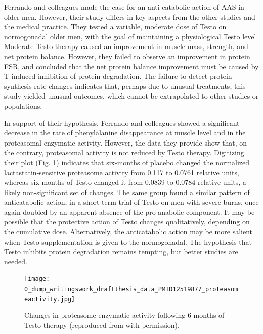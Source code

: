 \documentclass[12pt,english]{report}\usepackage[]{graphicx}\usepackage[]{color}
\begin{document}
Ferrando and colleagues made the case for an anti-catabolic action
of AAS in older men\citep{ferrando2003differential}. However, their
study differs in key aspects from the other studies and the medical
practice. They tested a variable, moderate dose of Testo on normogonadal
older men, with the goal of maintaining a physiological Testo level.
Moderate Testo therapy caused an improvement in muscle mass, strength,
and net protein balance. However, they failed to observe an improvement
in protein FSR, and concluded that the net protein balance improvement
must be caused by T-induced inhibition of protein degradation. The
failure to detect protein synthesis rate changes indicates that, perhaps
due to unusual treatments, this study yielded unusual outcomes, which
cannot be extrapolated to other studies or populations.

In support of their hypothesis, Ferrando and colleagues showed a significant
decrease in the rate of phenylalanine disappearance at muscle level
and in the proteasomal enzymatic activity. However, the data they
provide show that, on the contrary, proteasomal activity is not reduced
by Testo therapy. Digitizing their plot (Fig. \ref{fig:Changes-in-proteasome})
indicates that six-months of placebo changed the normalized lactastatin-sensitive
proteasome activity from 0.117
to 0.0761
relative units, whereas six months of Testo changed it from 0.0839
to 0.0784
relative units, a likely non-significant set of changes. The same
group found a similar pattern of anticatabolic action, in a short-term
trial of Testo on men with severe burns, once again doubled by an
apparent absence of the pro-anabolic component\citep{ferrando2001testosterone}.
It may be possible that the protective action of Testo changes qualitatively,
depending on the cumulative dose. Alternatively, the anticatabolic
action may be more salient when Testo supplementation is given to
the normogonadal. The hypothesis that Testo inhibits protein degradation
remains tempting, but better studies are needed.

\begin{figure}
\texttt{[image: 0\_dump\_writingswork\_draftthesis\_data\_PMID12519877\_proteasomeactivity.jpg]}

\protect\caption{Changes in proteasome enzymatic activity following 6 months of Testo
therapy (reproduced from \citep{ferrando2003differential} with permission).\label{fig:Changes-in-proteasome}}
\end{figure}
\end{document}
